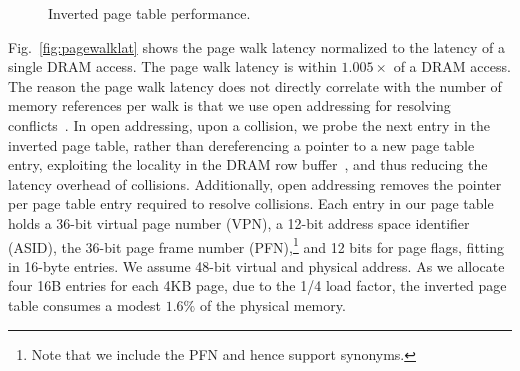 \begin{figure}
\centering
   \caption{Inverted page table performance.}
   \label{fig:IPT_perf_load_hash}
\end{figure}

Fig.~\ref{fig:pagewalklat} shows the page walk latency normalized to the latency of a single DRAM access. The page walk latency is within $1.005\times$ of a DRAM access. The reason the page walk latency does not directly correlate with the number of memory references per walk is that we use open addressing for resolving conflicts~\cite{yaniv:hash}. In open addressing, upon a collision, we probe the next entry in the inverted page table, rather than dereferencing a pointer to a new page table entry, exploiting the locality in the DRAM row buffer~\cite{qureshi:fundamental}, and thus reducing the latency overhead of collisions. Additionally, open addressing removes the pointer per page table entry required to resolve collisions. Each entry in our page table holds a 36-bit virtual page number (VPN), a 12-bit address space identifier (ASID), the 36-bit page frame number (PFN),\footnote{Note that we include the PFN and hence support synonyms.} and 12 bits for page flags, fitting in 16-byte entries. We assume 48-bit virtual and physical address. As we allocate four 16B entries for each 4KB page, due to the 1/4 load factor, the inverted page table consumes a modest $1.6\%$ of the physical memory.  

